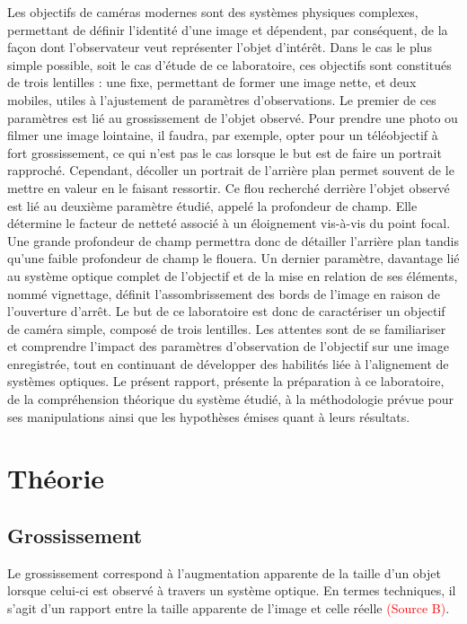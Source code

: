 \documentclass[11pt,letterpaper]{article}
\begin{document}
Les objectifs de caméras modernes sont des systèmes physiques complexes, permettant de définir l'identité d'une image et dépendent, par conséquent, de la façon dont l'observateur veut représenter l'objet d'intérêt. Dans le cas le plus simple possible, soit le cas d'étude de ce laboratoire, ces objectifs sont constitués de trois lentilles : une fixe, permettant de former une image nette, et deux mobiles, utiles à l'ajustement de paramètres d'observations. Le premier de ces paramètres est lié au grossissement de l'objet observé. Pour prendre une photo ou filmer une image lointaine, il faudra, par exemple, opter pour un téléobjectif à fort grossissement, ce qui n'est pas le cas lorsque le but est de faire un portrait rapproché. Cependant, décoller un portrait de l'arrière plan permet souvent de le mettre en valeur en le faisant ressortir. Ce flou recherché derrière l'objet observé est lié au deuxième paramètre étudié, appelé la profondeur de champ. Elle détermine le facteur de netteté associé à un éloignement vis-à-vis du point focal. Une grande profondeur de champ permettra donc de détailler l'arrière plan tandis qu'une faible profondeur de champ le flouera. Un dernier paramètre, davantage lié au système optique complet de l'objectif et de la mise en relation de ses éléments, nommé vignettage, définit l'assombrissement des bords de l'image en raison de l'ouverture d'arrêt. Le but de ce laboratoire est donc de caractériser un objectif de caméra simple, composé de trois lentilles. Les attentes sont de se familiariser et comprendre l'impact des paramètres d'observation de l'objectif sur une image enregistrée, tout en continuant de développer des habilités liée à l'alignement de systèmes optiques. Le présent rapport, présente la préparation à ce laboratoire, de la compréhension théorique du système étudié, à la méthodologie prévue pour ses manipulations ainsi que les hypothèses émises quant à leurs résultats. 

\section{Théorie}

\subsection{Grossissement}
Le grossissement correspond à l'augmentation apparente de la taille d'un objet lorsque celui-ci est observé à travers un système optique. En termes techniques, il s'agit d'un rapport entre la taille apparente de l'image et celle réelle \textcolor{red}{(Source B)}. 
\end{document}
